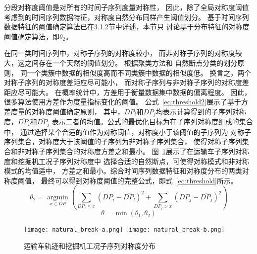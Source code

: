 分段对称度阈值是对所有的时间子序列度量对称性，
因此，除了全局对称度阈值
考虑到的时间序列数据特征，对称度自然分布同样产生阈值划分。
基于时间序列数据特征的阈值确定算法已在3.1.2节中详述，本节只
讨论基于分布特征的对称度阈值确定算法，即$\theta_2$。

在同一类时间序列中，对称子序列的对称度较小，
而非对称子序列的对称度较大，这之间存在一个天然的阈值划分\cite{2022968}。
根据聚类方法\cite{DBLP:conf/kdd/EsterKSX96}和
自然断点分类的划分原则\cite{DBLP:journals/pami/Cheng95}，
同一个类簇中数据的相似度高而不同类簇中数据的相似度低。
换言之，两个对称子序列的对称度差距应尽可能小，
而对称子序列与非对称子序列的对称度差距应尽可能大。
在概率统计中，方差用于衡量数据集中数据的偏离程度。
因此，很多算法使用方差作为度量指标变化的阈值\cite{DBLP:conf/sigmod/SongZW16}。
公式~\ref{eq:threshold2}展示了基于方差度量的对称度阈值确定原则，
其中，$DP_i$和$DP_j$均表示计算得到的子序列对称度，$\overline{DP_{i}}$̅和$\overline{DP_{j}}$
表示二者的均值。公式的最优化目标为在子序列对称度组成的集合中，
通过选择某个合适的值作为对称阈值，对称度小于该阈值的子序列为
对称子序列集合，对称度大于该阈值的子序列为非对称子序列集合，
使得对称子序列集合和非对称子序列集合的对称度方差之和最小。
图~\ref{fig:natural_break}展示了在运输车子序列对称度和挖掘机工况子序列对称度中
选择合适的自然断点，可使得对称模式和非对称模式的均值适中，
方差之和最小。综合时间序列数据特征和对称度分布的两类对称度阈值，
最终可以得到对称度阈值的完整公式，即式~\ref{eq:threshold}所示。
\begin{equation}
  \theta_{2}=\underset{x \in D P}{\operatorname{argmin}}\left(\sum_{D P_{i} \leq x}\left(D P_{i}-\overline{D P_{l}}\right)^{2}+\sum_{D P_{j}>x}\left(D P_{j}-\overline{D P_{j}}\right)^{2}\right)
  \label{eq:threshold2}
\end{equation}
\begin{equation}
  \theta=\min \left(\theta_{1}, \theta_{2}\right)
  \label{eq:threshold}
\end{equation}
\begin{figure}
  \centering
  {\texttt{[image: natural\_break-a.png]}}
  {\texttt{[image: natural\_break-b.png]}}
  \caption{运输车轨迹和挖掘机工况子序列对称度分布}
  \label{fig:natural_break}
\end{figure}

\renewcommand{\algorithmicrequire}{\textbf{输入：}\unskip}
\renewcommand{\algorithmicensure}{\textbf{输出：}\unskip}

